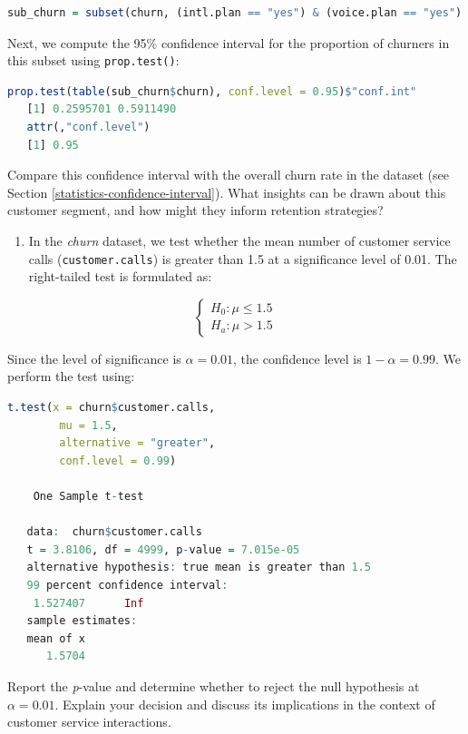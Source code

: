 \documentclass[
  11pt,
]{book}
\newcommand{\passthrough}[1]{#1}
\providecommand{\tightlist}{%
  \setlength{\itemsep}{0pt}\setlength{\parskip}{0pt}}
\theoremstyle{definition}
\theoremstyle{definition}
\theoremstyle{definition}
\theoremstyle{definition}
\theoremstyle{remark}
\begin{document}
\begin{lstlisting}[language=R]
sub_churn = subset(churn, (intl.plan == "yes") & (voice.plan == "yes") & (day.mins > 220)) 
\end{lstlisting}

Next, we compute the 95\% confidence interval for the proportion of churners in this subset using \passthrough{\lstinline!prop.test()!}:

\begin{lstlisting}[language=R]
prop.test(table(sub_churn$churn), conf.level = 0.95)$"conf.int"
   [1] 0.2595701 0.5911490
   attr(,"conf.level")
   [1] 0.95
\end{lstlisting}

Compare this confidence interval with the overall churn rate in the dataset (see Section \ref{statistics-confidence-interval}). What insights can be drawn about this customer segment, and how might they inform retention strategies?

\begin{enumerate}
\def\labelenumi{\arabic{enumi}.}
\setcounter{enumi}{11}
\tightlist
\item
  In the \emph{churn} dataset, we test whether the mean number of customer service calls (\passthrough{\lstinline!customer.calls!}) is greater than 1.5 at a significance level of 0.01. The right-tailed test is formulated as:
\end{enumerate}

\[
\begin{cases}
  H_0:  \mu \leq 1.5 \\
  H_a:  \mu > 1.5
\end{cases}
\]

Since the level of significance is \(\alpha = 0.01\), the confidence level is \(1-\alpha = 0.99\). We perform the test using:

\begin{lstlisting}[language=R]
t.test(x = churn$customer.calls, 
        mu = 1.5, 
        alternative = "greater", 
        conf.level = 0.99)
   
    One Sample t-test
   
   data:  churn$customer.calls
   t = 3.8106, df = 4999, p-value = 7.015e-05
   alternative hypothesis: true mean is greater than 1.5
   99 percent confidence interval:
    1.527407      Inf
   sample estimates:
   mean of x 
      1.5704
\end{lstlisting}

Report the \emph{p}-value and determine whether to reject the null hypothesis at \(\alpha=0.01\). Explain your decision and discuss its implications in the context of customer service interactions.
\end{document}
